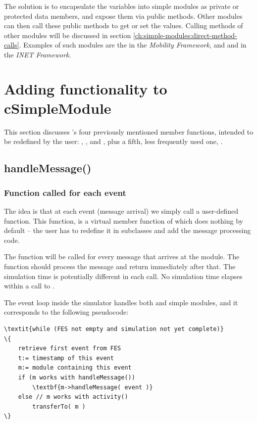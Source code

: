 The solution is to encapsulate the variables into simple modules
as private or protected data members, and expose them via public methods.
Other modules can then call these public methods to get or set the values.
Calling methods of other modules will be discussed in section
\ref{ch:simple-modules:direct-method-calls}.
Examples of such modules are the  in the \textit{Mobility Framework},
and  and  in the \textit{INET Framework}.



\section{Adding functionality to cSimpleModule}

This section discusses 's four previously
mentioned member functions, intended to be redefined by the user:
, , 
and , plus a fifth, less frequently used one,
.



\subsection{handleMessage()}

\subsubsection{Function called for each event}


The idea is that at each event (message arrival) we
simply call a user-defined function. This function,
 is a
virtual member function of  which does
nothing by default -- the user has to redefine it in subclasses
and add the message processing code.

The  function will be called for every message
that arrives at the module. The function should process the message
and return immediately after that. The simulation time is potentially
different in each call. No simulation time elapses within a call
to .

The event loop inside the simulator handles both 
and  simple modules, and it corresponds
to the following pseudocode:

\begin{Verbatim}[commandchars=\\\{\}]
\textit{while (FES not empty and simulation not yet complete)}
\{
    retrieve first event from FES
    t:= timestamp of this event
    m:= module containing this event
    if (m works with handleMessage())
        \textbf{m->handleMessage( event )}
    else // m works with activity()
        transferTo( m )
\}
\end{Verbatim}

